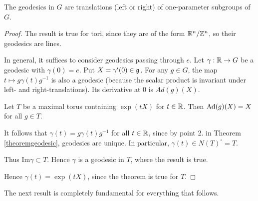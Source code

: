 \documentclass[11pt, english]{article}
\begin{document}
\begin{thm}
 The geodesics in $G$ are translations (left or right) of one-parameter subgroups of $G$.
\end{thm}

\begin{proof}

The result is true for tori, since they are of the form $\mathbb{R}^n/\mathbb{Z}^n$, so their geodesics are lines.

In general, it suffices to consider geodesics passing through $e$. Let $\gamma: \mathbb{R} \to G$ be a geodesic with $\gamma(0)=e$. Put $X= \gamma'(0) \in \mathfrak g$. For any $g \in G$, the map $t \mapsto g \gamma(t) g^{-1}$ is also a geodesic (because the scalar product is invariant under left- and right-translations). Its derivative at $0$ is $Ad(g)(X)$.

Let $T$ be a maximal torus containing $\exp(tX)$ for $t \in \mathbb{R}$. Then $\operatorname{Ad}(g)(X)=X$ for all $g \in T$. 

It follows that $\gamma(t)=g \gamma(t) g^{-1}$ for all $t \in \mathbb{R}$, since by point 2. in Theorem \ref{theoremgeodesic}, geodesics are unique. In particular, $\gamma(t) \in N(T)^\circ =T $. 

Thus $\mathrm{Im} \gamma \subset T$. Hence $\gamma$ is a geodesic in $T$, where the result is true. 

Hence $\gamma(t) = \exp(tX)$, since the theorem is true for $T$.
\end{proof}

The next result is completely fundamental for everything that follows.
\end{document}
